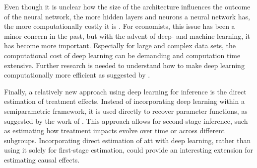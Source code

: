 Even though it is unclear how the size of the architecture influences the outcome of the neural network, the more hidden layers and neurons a neural network has, the more computationally costly it is \citep{thompson2020computational}.
For economists, this issue has been a minor concern in the past, but with the advent of deep- and machine learning, it has become more important.
Especially for large and complex data sets, the computational cost of deep learning can be demanding and computation time extensive.
Further research is needed to understand how to make deep learning computationally more efficient as suggested by \citet{farrellDeepNeuralNetworks2021}.

Finally, a relatively new approach using deep learning for inference is the direct estimation of treatment effects.
Instead of incorporating deep learning within a semiparametric framework, it is used directly to recover parameter functions, as suggested by the work of \citet{DeepLearningIndividual2021}.
This approach allows for second-stage inference, such as estimating how treatment impacts evolve over time or across different subgroups.
Incorporating direct estimation of \ac{att} with deep learning, rather than using it solely for first-stage estimation, could provide an interesting extension for estimating causal effects.
